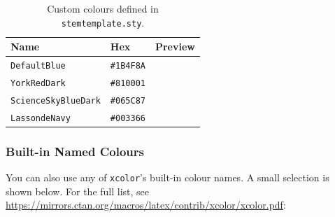 \begin{table}[H]
	\centering
	\caption{Custom colours defined in \texttt{stemtemplate.sty}.}
	\label{tab:custom-colours}
	\begin{tabular}{@{}lll@{}}
		\toprule
		Name & Hex & Preview \\
		\midrule
		\texttt{DefaultBlue}  & \texttt{\#1B4F8A} & \textcolor{white}{\colorbox{DefaultBlue}{\phantom{XXXXX}}}  \\
		\texttt{YorkRedDark}     & \texttt{\#810001} & \textcolor{white}{\colorbox{YorkRedDark}{\phantom{XXXXX}}}     \\
		\texttt{ScienceSkyBlueDark}  & \texttt{\#065C87} & \textcolor{white}{\colorbox{ScienceSkyBlueDark}{\phantom{XXXXX}}}  \\
		\texttt{LassondeNavy} & \texttt{\#003366} & \textcolor{white}{\colorbox{LassondeNavy}{\phantom{XXXXX}}} \\
		\bottomrule
	\end{tabular}
\end{table}

\subsubsection{Built-in Named Colours}
You can also use any of \texttt{xcolor}'s built-in colour names. A small selection is shown below. For the full list, see \url{https://mirrors.ctan.org/macros/latex/contrib/xcolor/xcolor.pdf}:

